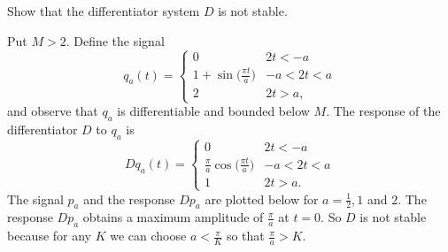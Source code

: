 \begin{excersizelist}
\item \label{excer:diffnotstable} Show that the differentiator system $D$ is not  stable.
\begin{solution}
Put $M > 2$.  Define the signal
\[
q_a(t) = \begin{cases}
0 & 2t < -a \\
1 + \sin\big(\tfrac{\pi t}{a}\big) & -a < 2t < a \\
2 & 2t > a,
\end{cases}
\]
and observe that $q_a$ is differentiable and bounded below $M$.  The response of the differentiator $D$ to $q_a$ is
\[
Dq_a(t) = \begin{cases}
0 & 2t < -a \\
\tfrac{\pi}{a} \cos\big(\tfrac{\pi t}{a}\big) & -a < 2t < a \\
1 & 2t > a.
\end{cases}
\]
The signal $p_a$ and the response $Dp_a$ are plotted below for $a = \tfrac{1}{2},1$ and $2$.  The response $Dp_a$ obtains a maximum amplitude of $\tfrac{\pi}{a}$ at $t=0$.  So $D$ is not stable because for any $K$ we can choose $a < \tfrac{\pi}{K}$ so that $\tfrac{\pi}{a} > K$.

\newcommand{\sinpulse}[1]{
\draw[color=black,thick] (-1.5,0) -- (-#1/2,0) node {};
\draw[smooth,color=black,thick,domain=-#1/2.0:#1/2.0] plot function{1 + sin(3.14159265359*x/#1)};
\draw[color=black,thick] (#1/2,2) -- (1.5,2)  node {};
}
\newcommand{\responsesinpulse}[1]{
\draw[color=black,thick] (-1.5,0) -- (-#1/2,0) node {};
\draw[smooth,color=black,thick,domain=-#1/2.0:#1/2.0] plot function{3.14159265359/#1*cos(3.14159265359*x/#1)};
\draw[color=black,thick] (#1/2,0) -- (1.5,0)  node {};
}
\newcommand{\sinpulseresponse}[1]{}
\begin{center}
\;\;
\end{center}
\end{solution}


\end{excersizelist}
